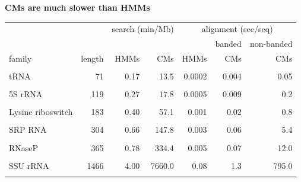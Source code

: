 \documentclass[landscape]{slides}
\begin{document}
\begin{slide}
\begin{center}
\textbf{CMs are much slower than HMMs}
\end{center}
\medskip

\begin{center}
\small
\begin{tabular}{lr|rr|rrr}
                  &        & \multicolumn{2}{c|}{search (min/Mb)} &   \multicolumn{3}{c}{alignment (sec/seq)} \\ \cline{3-7}
                  &        &        &        &         & banded  & non-banded \\
family            & length & HMMs   & CMs    &    HMMs & CMs     & CMs \\ \hline
                  &        &        &        &         &         & \\
tRNA              & 71     &  0.17 &  13.5 &  0.0002& 0.004  & 0.05  \\
                  &        &        &        &         &         & \\
5S rRNA           & 119    &  0.27 &  17.8 &  0.0005& 0.009  & 0.2  \\
                  &        &        &        &         &         & \\
Lysine riboswitch & 183    &  0.40  & 57.1 &  0.001& 0.02   & 0.8 \\
                  &        &        &        &         &         & \\
SRP RNA           & 304    &  0.66  & 147.8 &  0.003&  0.06  &  5.4 \\
                  &        &        &        &         &         &  \\
RNaseP            & 365    &  0.78 &334.4 &  0.005 &  0.07  & 12.0 \\
                  &        &        &        &         &         & \\
SSU rRNA          & 1466   &  4.00 &7660.0 &  0.08  &   1.3  & 795.0 \\
                  &        &        &        &         &         & \\
\end{tabular}
\end{center}


\end{slide}
\end{document}
